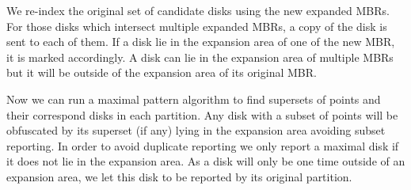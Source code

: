 \documentclass[12pt]{scrartcl}
\begin{document}
We re-index the original set of candidate disks using the new expanded MBRs.  For those disks which intersect multiple expanded MBRs, a copy of the disk is sent to each of them. If a disk lie in the expansion area of one of the new MBR, it is marked accordingly. A disk can lie in the expansion area of multiple MBRs but it will be outside of the expansion area of its original MBR. 

Now we can run a maximal pattern algorithm to find supersets of points and their correspond disks in each partition. Any disk with a subset of points will be obfuscated by its superset (if any) lying in the expansion area avoiding subset reporting.  In order to avoid duplicate reporting we only report a maximal disk if it does not lie in the expansion area. As a disk will only be one time outside of an expansion area, we let this disk to be reported by its original partition.

\clearpage
\end{document}
